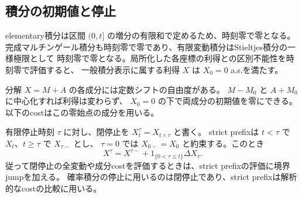 \subsection{積分の初期値と停止}

elementary積分は区間 $(0,t]$ の増分の有限和で定めるため、時刻零で零となる。
完成マルチンゲール積分も時刻零で零であり、有限変動積分はStieltjes積分の一様極限として
時刻零で零となる。局所化した各座標の利得との区別不能性を時刻零で評価すると、
一般積分表示に属する利得 $X$ は $X_0=0$ a.s.を満たす。

分解 $X=M+A$ の各成分には定数シフトの自由度がある。
$M-M_0$ と $A+M_0$ に中心化すれば利得は変わらず、
$X_0=0$ の下で両成分の初期値を零にできる。以下のcostはこの零始点の成分を用いる。

有限停止時刻 $\tau$ に対し、閉停止を $X^\tau_t=X_{t\wedge\tau}$ と書く。
strict prefixは $t<\tau$ で $X_t$、$t\geq\tau$ で $X_{\tau-}$ とし、
$\tau=0$ では $X_{0-}=X_0$ と約束する。このとき
\[
 X^\tau=X^{\tau-}+1_{\{0<\tau\leq t\}}\Delta X_\tau.
\]
従って閉停止の全変動や成分costを評価するときは、strict prefixの評価に境界jumpを加える。
確率積分の停止に用いるのは閉停止であり、strict prefixは解析的なcostの比較に用いる。

